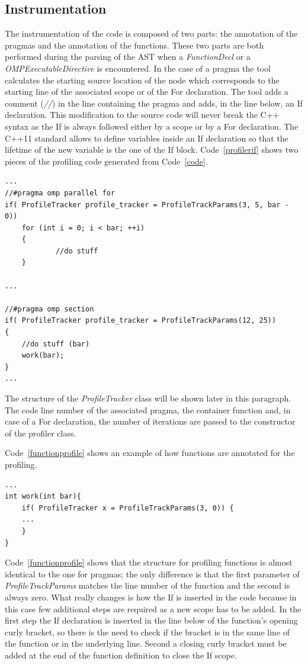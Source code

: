 \documentclass[a4paper,11pt,oneside]{book}
\begin{document}
\subsection{Instrumentation}
The instrumentation of the code is composed of two parts: the annotation of the pragmas and the annotation of the functions. These two parts are both performed during the parsing of the AST when a \emph{FunctionDecl} or a \emph{OMPExecutableDirective} is encountered. In the case of a pragma the tool calculates the starting source location of the node which corresponds to the starting line of the associated scope or of the For declaration. The tool adds a comment (\emph{//}) in the line containing the pragma and adds, in the line below,  an If declaration.  This modification to the source code will never break the C++ syntax as the If is always followed either by a scope or by a For declaration. The C++11 standard allows to define variables inside an If declaration so that the lifetime of the new variable is the one of the If block. Code~\ref{profilerif} shows two pieces of the profiling code generated from Code~\ref{code}.

\begin{lstlisting}[language=CCC, caption=Parts of the profiling code generated from Code~\ref{code}., label=profilerif]
...
//#pragma omp parallel for
if( ProfileTracker profile_tracker = ProfileTrackParams(3, 5, bar - 0))
	for (int i = 0; i < bar; ++i)
	{
    		//do stuff
	}
  
...

//#pragma omp section
if( ProfileTracker profile_tracker = ProfileTrackParams(12, 25))
{
    //do stuff (bar)
    work(bar);
}
...
\end{lstlisting}

The structure of the \emph{ProfileTracker} class will be shown later in this paragraph. The code line number of the associated pragma, the container function and, in case of a For declaration, the number of iterations are passed to the constructor of the profiler class.

Code~\ref{functionprofile} shows an example of how functions are annotated for the profiling. 

\begin{lstlisting}[language=CCC, caption=Example of a profiled function from Code~\ref{code}., label=functionprofile ]
...
int work(int bar){
	if( ProfileTracker x = ProfileTrackParams(3, 0)) {
	...
	}
}
\end{lstlisting}

Code~\ref{functionprofile} shows that the structure for profiling functions is almost identical to the one for pragmas; the only difference is that the first parameter of \emph{ProfileTrackParams} matches the line number of the function and the second is always zero. What really changes is how the If is inserted in the code because in this case few additional steps are required as a new scope has to be added. In the first step the If declaration is inserted in the line below of the function’s opening curly bracket, so there is the need to check if the bracket is in the same line of the function or in the underlying line. Second a closing curly bracket must be added at the end of the function definition to close the If scope.
\end{document}
